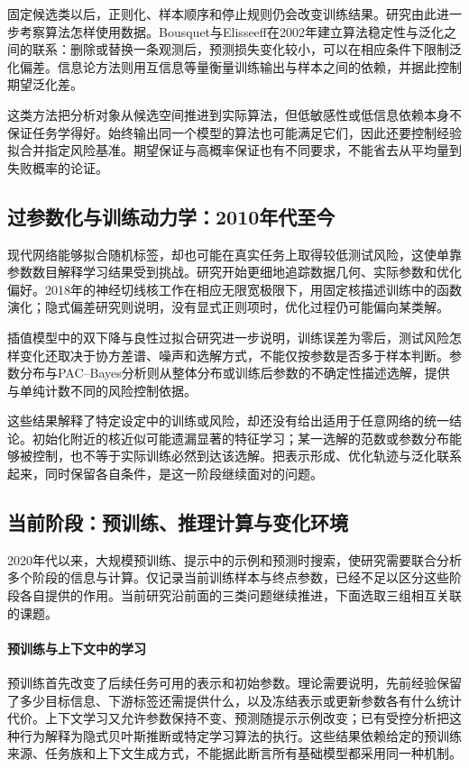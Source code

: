 固定候选类以后，正则化、样本顺序和停止规则仍会改变训练结果。研究由此进一步考察算法怎样使用数据。Bousquet与Elisseeff在2002年建立算法稳定性与泛化之间的联系：删除或替换一条观测后，预测损失变化较小，可以在相应条件下限制泛化偏差。信息论方法则用互信息等量衡量训练输出与样本之间的依赖，并据此控制期望泛化差。

这类方法把分析对象从候选空间推进到实际算法，但低敏感性或低信息依赖本身不保证任务学得好。始终输出同一个模型的算法也可能满足它们，因此还要控制经验拟合并指定风险基准。期望保证与高概率保证也有不同要求，不能省去从平均量到失败概率的论证。

\subsection{过参数化与训练动力学：2010年代至今}

现代网络能够拟合随机标签，却也可能在真实任务上取得较低测试风险，这使单靠参数数目解释学习结果受到挑战。研究开始更细地追踪数据几何、实际参数和优化偏好。2018年的神经切线核工作在相应无限宽极限下，用固定核描述训练中的函数演化；隐式偏差研究则说明，没有显式正则项时，优化过程仍可能偏向某类解。

插值模型中的双下降与良性过拟合研究进一步说明，训练误差为零后，测试风险怎样变化还取决于协方差谱、噪声和选解方式，不能仅按参数是否多于样本判断。参数分布与PAC--Bayes分析则从整体分布或训练后参数的不确定性描述选解，提供与单纯计数不同的风险控制依据。

这些结果解释了特定设定中的训练或风险，却还没有给出适用于任意网络的统一结论。初始化附近的核近似可能遗漏显著的特征学习；某一选解的范数或参数分布能够被控制，也不等于实际训练必然到达该选解。把表示形成、优化轨迹与泛化联系起来，同时保留各自条件，是这一阶段继续面对的问题。

\subsection{当前阶段：预训练、推理计算与变化环境}

2020年代以来，大规模预训练、提示中的示例和预测时搜索，使研究需要联合分析多个阶段的信息与计算。仅记录当前训练样本与终点参数，已经不足以区分这些阶段各自提供的作用。当前研究沿前面的三类问题继续推进，下面选取三组相互关联的课题。

\paragraph{预训练与上下文中的学习}
预训练首先改变了后续任务可用的表示和初始参数。理论需要说明，先前经验保留了多少目标信息、下游标签还需提供什么，以及冻结表示或更新参数各有什么统计代价。上下文学习又允许参数保持不变、预测随提示示例改变；已有受控分析把这种行为解释为隐式贝叶斯推断或特定学习算法的执行。这些结果依赖给定的预训练来源、任务族和上下文生成方式，不能据此断言所有基础模型都采用同一种机制。

